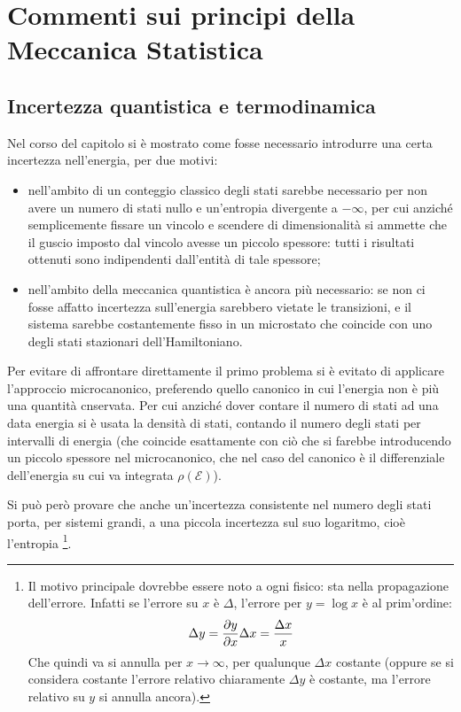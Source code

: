 \section{Commenti sui principi della Meccanica Statistica}

\subsection{Incertezza quantistica e termodinamica}
Nel corso del capitolo si è mostrato come fosse necessario introdurre una certa incertezza nell'energia, per due motivi:
\begin{itemize}
	\item nell'ambito di un conteggio classico degli stati sarebbe necessario per non avere un numero di stati nullo e un'entropia divergente a $-\infty$, per cui anziché semplicemente fissare un vincolo e scendere di dimensionalità si ammette che il guscio imposto dal vincolo avesse un piccolo spessore: tutti i risultati ottenuti sono indipendenti dall'entità di tale spessore;
	\item nell'ambito della meccanica quantistica è ancora più necessario: se non ci fosse affatto incertezza sull'energia sarebbero vietate le transizioni, e il sistema sarebbe costantemente fisso in un microstato che coincide con uno degli stati stazionari dell'Hamiltoniano.
\end{itemize}

Per evitare di affrontare direttamente il primo problema si è evitato di applicare l'approccio microcanonico, preferendo quello canonico in cui l'energia non è più una quantità cnservata. Per cui anziché dover contare il numero di stati ad una data energia si è usata la densità di stati, contando il numero degli stati per intervalli di energia (che coincide esattamente con ciò che si farebbe introducendo un piccolo spessore nel microcanonico, che nel caso del canonico è il differenziale dell'energia su cui va integrata $\rho(\mathcal{E})$).
\newline

Si può però provare che anche un'incertezza consistente nel numero degli stati porta, per sistemi grandi, a una piccola incertezza sul suo logaritmo, cioè l'entropia
\footnote{Il motivo principale dovrebbe essere noto a ogni fisico: sta nella propagazione dell'errore. Infatti se l'errore su $x$ è $\Delta$, l'errore per $y = \log x$ è al prim'ordine:
\begin{equation*}
\Delta y = \frac{\partial {y}}{\partial {x}} \Delta x = \frac{\Delta x}{x}
\end{equation*}
Che quindi va si annulla per $x \rightarrow \infty$, per qualunque $\Delta x$ costante (oppure se si considera costante l'errore relativo chiaramente $\Delta y$ è costante, ma l'errore relativo su $y$ si annulla ancora).}.
\newline

